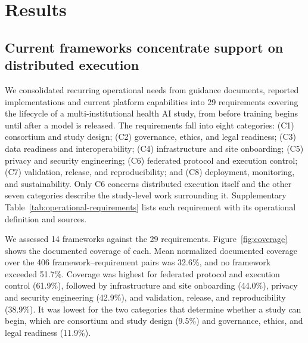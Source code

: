 \documentclass[preprint,5p, 10pt, times]{elsarticle}
\begin{document}
\section*{Results}

\subsection*{Current frameworks concentrate support on distributed execution}


We consolidated recurring operational needs from guidance documents, reported implementations and
current platform capabilities into 29 requirements covering the lifecycle of a multi-institutional health AI
study, from before training begins until after a model is released.
The requirements fall into eight categories: 
(C1) consortium and study design; 
(C2) governance, ethics, and legal readiness; 
(C3) data readiness and interoperability; 
(C4) infrastructure and site onboarding; 
(C5) privacy and security engineering; 
(C6) federated protocol and execution control; 
(C7) validation, release, and reproducibility; and 
(C8) deployment, monitoring, and sustainability.
Only C6 concerns distributed execution itself and the other seven categories describe the study-level work surrounding it.
Supplementary Table~\ref{tab:operational-requirements} lists each requirement with its
operational definition and sources.


% 

We assessed 14 frameworks against the 29 requirements.
%
Figure~\ref{fig:coverage} shows the documented coverage of each.
%
Mean normalized documented coverage over the 406 framework–requirement pairs was 32.6\%, and no framework exceeded 51.7\%.
Coverage was highest for federated protocol and execution control (61.9\%),
followed by infrastructure and site onboarding (44.0\%), privacy and
security engineering (42.9\%), and validation, release, and reproducibility
(38.9\%). It was lowest for the two categories that determine whether a
study can begin, which are consortium and study design (9.5\%) and governance,
ethics, and legal readiness (11.9\%). 
\end{document}

